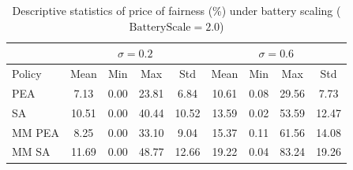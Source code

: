 \begin{table}[h]
\centering
\caption{Descriptive statistics of price of fairness (\%) under battery scaling ($\text{BatteryScale}=2.0$)}
\label{tab:price_of_fairness_battery}
\begin{tabular}{lcccccccc}
\hline
 & \multicolumn{4}{c}{$\sigma = 0.2$} & \multicolumn{4}{c}{$\sigma = 0.6$} \\
\hline
Policy & Mean & Min & Max & Std & Mean & Min & Max & Std \\
\hline
 PEA & 7.13 & 0.00 & 23.81 & 6.84 & 10.61 & 0.08 & 29.56 & 7.73 \\
 SA & 10.51 & 0.00 & 40.44 & 10.52 & 13.59 & 0.02 & 53.59 & 12.47 \\
 MM PEA & 8.25 & 0.00 & 33.10 & 9.04 & 15.37 & 0.11 & 61.56 & 14.08 \\
 MM SA & 11.69 & 0.00 & 48.77 & 12.66 & 19.22 & 0.04 & 83.24 & 19.26 \\
\hline
\end{tabular}
\end{table}
